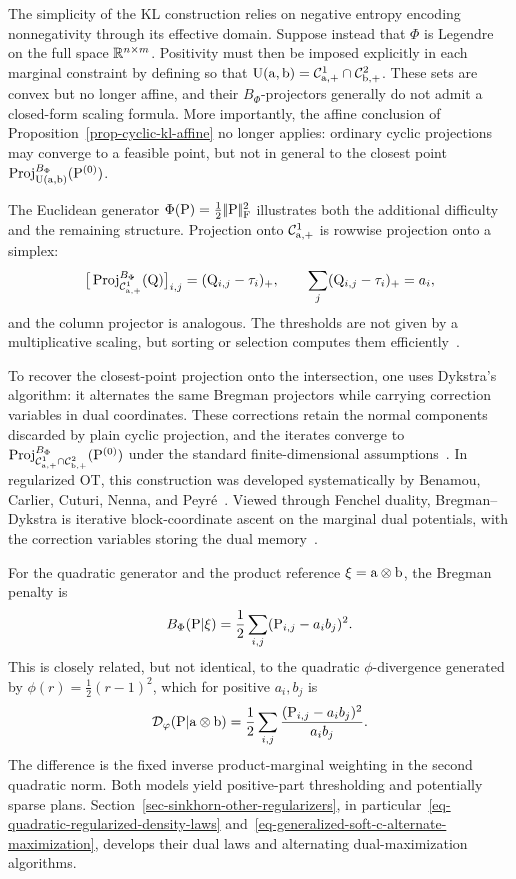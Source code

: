 The simplicity of the KL construction relies on negative entropy encoding nonnegativity through its effective domain. Suppose instead that $\Phi$ is Legendre on the full space $\RR^{n\times m}$. Positivity must then be imposed explicitly in each marginal constraint by defining
so that $\CouplingsD(\a,\b)=\Cc^1_{\a,+}\cap\Cc^2_{\b,+}$. These sets are convex but no longer affine, and their $B_\Phi$-projectors generally do not admit a closed-form scaling formula. More importantly, the affine conclusion of Proposition~\ref{prop-cyclic-kl-affine} no longer applies: ordinary cyclic projections may converge to a feasible point, but not in general to the closest point $\Proj_{\CouplingsD(\a,\b)}^{B_\Phi}(\P^{(0)})$.

The Euclidean generator $\Phi(\P)=\frac12\norm{\P}_{\mathrm F}^2$ illustrates both the additional difficulty and the remaining structure. Projection onto $\Cc^1_{\a,+}$ is rowwise projection onto a simplex:
\[
	\big[\Proj_{\Cc^1_{\a,+}}^{B_\Phi}(\Q)\big]_{i,j}
	=
	(\Q_{i,j}-\tau_i)_+,
	\qquad
	\sum_j(\Q_{i,j}-\tau_i)_+=a_i,
\]
and the column projector is analogous. The thresholds are not given by a multiplicative scaling, but sorting or selection computes them efficiently~\cite{blondel2018smooth}.

To recover the closest-point projection onto the intersection, one uses Dykstra's algorithm: it alternates the same Bregman projectors while carrying correction variables in dual coordinates. These corrections retain the normal components discarded by plain cyclic projection, and the iterates converge to $\Proj_{\Cc^1_{\a,+}\cap\Cc^2_{\b,+}}^{B_\Phi}(\P^{(0)})$ under the standard finite-dimensional assumptions~\cite{Dykstra85,CensorReich-Dykstra,bauschke-lewis}. In regularized OT, this construction was developed systematically by Benamou, Carlier, Cuturi, Nenna, and Peyr\'e~\cite{2015-benamou-cisc}. Viewed through Fenchel duality, Bregman--Dykstra is iterative block-coordinate ascent on the marginal dual potentials, with the correction variables storing the dual memory~\cite{BregmanCensorReich1999Dykstra}.

For the quadratic generator and the product reference $\xi=\a\otimes\b$, the Bregman penalty is
\[
	B_\Phi(\P|\xi)
	=
	\frac12\sum_{i,j}(\P_{i,j}-a_i b_j)^2.
\]
This is closely related, but not identical, to the quadratic $\phi$-divergence generated by $\phi(r)=\frac12(r-1)^2$, which for positive $a_i,b_j$ is
\[
	\Divergm_\phi(\P|\a\otimes\b)
	=
	\frac12\sum_{i,j}\frac{(\P_{i,j}-a_i b_j)^2}{a_i b_j}.
\]
The difference is the fixed inverse product-marginal weighting in the second quadratic norm. Both models yield positive-part thresholding and potentially sparse plans. Section~\ref{sec-sinkhorn-other-regularizers}, in particular~\eqref{eq-quadratic-regularized-density-laws} and~\eqref{eq-generalized-soft-c-alternate-maximization}, develops their dual laws and alternating dual-maximization algorithms.

